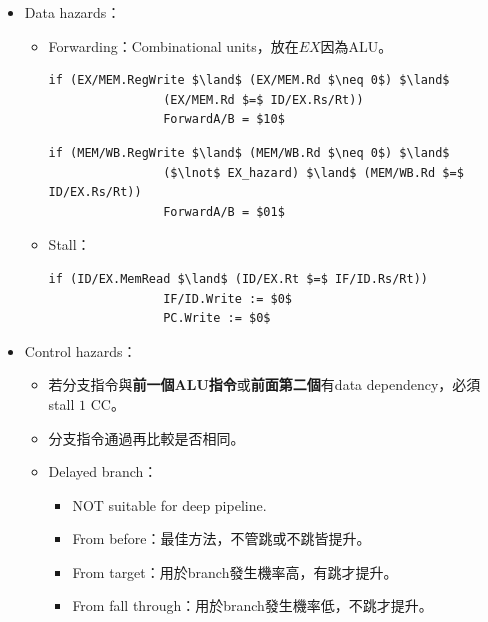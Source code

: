 \begin{itemize}
\begin{table}[H]
\begin{tabular}{|c|c|c|}
            \hline
        \end{tabular}
    \end{table}
    \item Data hazards：\begin{itemize}
        \item Forwarding：Combinational units，放在$EX$因為ALU。
        \begin{lstlisting}[caption={EX hazard.}, captionpos=b, mathescape=true, language={[x86masm]Assembler}, autogobble=true]
            if (EX/MEM.RegWrite $\land$ (EX/MEM.Rd $\neq 0$) $\land$ 
                (EX/MEM.Rd $=$ ID/EX.Rs/Rt))
                ForwardA/B = $10$
        \end{lstlisting}
        \begin{lstlisting}[caption={MEM hazard.}, captionpos=b, mathescape=true, language={[x86masm]Assembler}, autogobble=true]
            if (MEM/WB.RegWrite $\land$ (MEM/WB.Rd $\neq 0$) $\land$ 
                ($\lnot$ EX_hazard) $\land$ (MEM/WB.Rd $=$ ID/EX.Rs/Rt))
                ForwardA/B = $01$
        \end{lstlisting}
        \item Stall：\code{}
        \begin{lstlisting}[caption={Stall.}, captionpos=b, mathescape=true, language={[x86masm]Assembler}, autogobble=true]
            if (ID/EX.MemRead $\land$ (ID/EX.Rt $=$ IF/ID.Rs/Rt))
                IF/ID.Write := $0$
                PC.Write := $0$
        \end{lstlisting}
    \end{itemize}
    \item Control hazards：\begin{itemize}
        \item 若分支指令與\textbf{前一個ALU指令}或\textbf{前面第二個}有data dependency，必須stall $1$ CC。
        \item 分支指令通過再比較是否相同。
        \item Delayed branch：\begin{itemize}
            \item NOT suitable for deep pipeline.
            \item From before：最佳方法，不管跳或不跳皆提升。
            \item From target：用於branch發生機率高，有跳才提升。
            \item From fall through：用於branch發生機率低，不跳才提升。
            \begin{figure}[H]

\end{figure}
\end{itemize}
\end{itemize}
\end{itemize}
